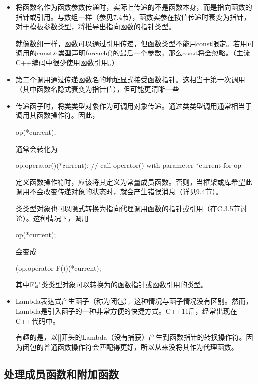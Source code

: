 \begin{itemize}
\item
将函数名作为函数参数传递时，实际上传递的不是函数本身，而是指向函数的指针或引用。与数组一样（参见7.4节），函数实参在按值传递时衰变为指针，对于模板参数类型，将推导出指向函数的指针类型。

就像数组一样，函数可以通过引用传递，但函数类型不能用const限定。若用可调用的const\&类型声明foreach()的最后一个参数，那么const将会忽略。（主流C++编码中很少使用函数引用。）

\item
第二个调用通过传递函数名的地址显式接受函数指针。这相当于第一次调用（其中函数名隐式衰变为指针值），但可能更清晰一些

\item
传递函子时，将类类型对象作为可调用对象传递。通过类类型调用通常相当于调用其函数操作符。因此，

\begin{cpp}
op(*current);
\end{cpp}

通常会转化为

\begin{cpp}
op.operator()(*current); // call operator() with parameter *current for op
\end{cpp}

定义函数操作符时，应该将其定义为常量成员函数。否则，当框架或库希望此调用不会改变传递对象的状态时，就会产生错误消息（详见9.4节）。

类类型对象也可以隐式转换为指向代理调用函数的指针或引用（在C.3.5节讨论）。这种情况下，调用

\begin{cpp}
op(*current);
\end{cpp}

会变成

\begin{cpp}
(op.operator F())(*current);
\end{cpp}

其中F是类类型对象可以转换为的函数指针或函数引用的类型。

\item
Lambda表达式产生函子（称为闭包），这种情况与函子情况没有区别。然而，Lambda是引入函子的一种非常方便的快捷方式。C++11后，经常出现在C++代码中。

有趣的是，以[]开头的Lambda（没有捕获）产生到函数指针的转换操作符。因为闭包的普通函数操作符会匹配得更好，所以从来没将其作为代理函数。
\end{itemize}

\subsection{处理成员函数和附加函数}

